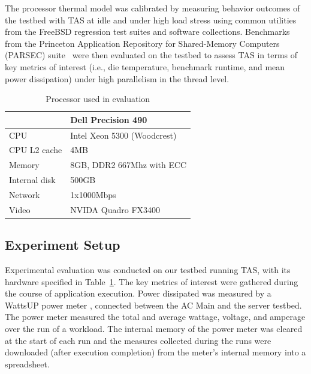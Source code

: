 \documentclass[times, 10pt,twocolumn]{IEEEtran}
\begin{document}
The processor thermal model was calibrated by measuring behavior
outcomes of the testbed with TAS at idle and under high load stress
using common utilities from the FreeBSD regression test suites and
software collections.  Benchmarks from the Princeton Application
Repository for Shared-Memory Computers (PARSEC) suite~\cite{Bienia2011}
were then evaluated on the testbed to assess TAS in terms of key metrics
of interest (i.e., die temperature, benchmark runtime, and mean power dissipation)
under high parallelism in the thread level.

\begin{small}
\begin{table}[tbhp] 
\centering
  \caption{Processor used in evaluation}
  \label{tab:hardware}
  \begin{tabular}{l l} 
\hline 
\hline
&\textbf{Dell Precision 490}\\ 
\hline 
CPU&Intel Xeon 5300 (Woodcrest)\\ 
CPU L2 cache&4MB\\ 
Memory&8GB, DDR2 667Mhz with ECC\\
Internal disk&500GB\\ 
Network&1x1000Mbps\\ 
Video&NVIDA Quadro FX3400\\ 
\hline
  \end{tabular}
\end{table}
\end{small}
\subsection{Experiment Setup}
\label{sec:experiment-setup} 
Experimental evaluation was conducted on our testbed running TAS, with
its hardware specified in Table~\ref{tab:hardware}.  The key metrics of
interest were gathered during the course of application execution.
Power dissipated was measured by a WattsUP power meter
\cite{WattsUp2006a}, connected between the AC Main and the server
testbed.  The power meter measured the total and average wattage,
voltage, and amperage over the run of a workload.  The internal memory
of the power meter was cleared at the start of each run and the measures
collected during the runs were downloaded (after execution completion)
from the meter's internal memory into a spreadsheet.
\end{document}
